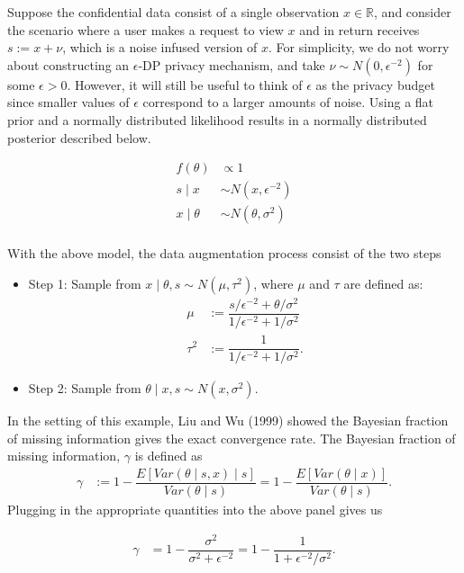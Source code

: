 Suppose the confidential data consist of a single observation \(x \in \mathbb{R}\),
and consider the scenario where a user makes a request to view \(x\) and
in return receives \(s := x + \nu\), which is a noise infused version of \(x\).
For simplicity, we do not worry about constructing an \(\epsilon\)-DP privacy mechanism,
and take \(\nu \sim N(0, \epsilon^{-2})\) for some \(\epsilon > 0\). However, it
will still be useful to think of \(\epsilon\) as the privacy budget since smaller values
of \(\epsilon\) correspond to a larger amounts of noise. Using
a flat prior and a normally distributed likelihood results in
a normally distributed posterior described below.

\[
\begin{aligned}
f(\theta) &\propto 1\\
s \mid x &\sim N(x, \epsilon^{-2})\\
x \mid \theta &\sim N(\theta, \sigma^2)\\
\end{aligned}
\]

With the above model, the data augmentation process consist of the
two steps

\begin{itemize}
\item
  Step 1: Sample from \(x \mid \theta, s \sim N(\mu, \tau^2)\), where
  \(\mu\) and \(\tau\) are defined as:
  \[
  \begin{aligned}
  \mu &:= \dfrac{s/\epsilon^{-2} + \theta/\sigma^2}{1/\epsilon^{-2} + 1/\sigma^2}\\
  \tau^2 &:= \dfrac{1}{1/\epsilon^{-2} + 1/\sigma^2}.
  \end{aligned}
  \]
\item
  Step 2: Sample from \(\theta \mid x, s \sim N(x, \sigma^2)\).
\end{itemize}

In the setting of this example, Liu and Wu (1999) showed the Bayesian fraction of missing information
gives the exact convergence rate. The Bayesian fraction of missing information, \(\gamma\) is
defined as
\begin{align*}
\gamma &:= 1 - \dfrac{E[Var(\theta \mid s, x) \mid s]}{Var(\theta \mid s)} = 1 - \dfrac{E[Var(\theta \mid x)]}{Var(\theta \mid s)}.
\end{align*}
Plugging in the appropriate quantities into the above panel gives us

\begin{align*}
\gamma &= 1 - \dfrac{\sigma^2}{\sigma^2 + \epsilon^{-2}} = 1 - \dfrac{1}{1 + \epsilon^{-2}/\sigma^2}.
\end{align*}

